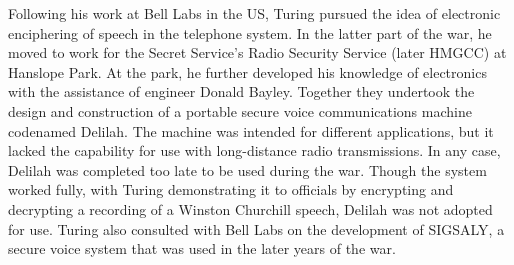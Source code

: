 \documentclass{article}
\begin{document}
Following his work at Bell Labs in the US, Turing pursued the idea of electronic enciphering of speech in the telephone system. In the latter part of the war, he moved to work for the Secret Service's Radio Security Service (later HMGCC) at Hanslope Park. At the park, he further developed his knowledge of electronics with the assistance of engineer Donald Bayley. Together they undertook the design and construction of a portable secure voice communications machine codenamed Delilah. The machine was intended for different applications, but it lacked the capability for use with long-distance radio transmissions. In any case, Delilah was completed too late to be used during the war. Though the system worked fully, with Turing demonstrating it to officials by encrypting and decrypting a recording of a Winston Churchill speech, Delilah was not adopted for use. Turing also consulted with Bell Labs on the development of SIGSALY, a secure voice system that was used in the later years of the war.
\\\\
\end{document}
